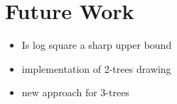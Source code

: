 \section{Future Work}\label{section:future_work}

\begin{itemize}
	\item Is log square a sharp upper bound
	\item implementation of 2-trees drawing
	\item new approach for 3-trees
\end{itemize}